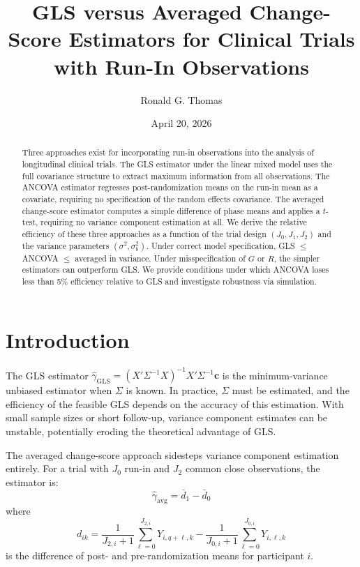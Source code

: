 \documentclass[
  11pt,
]{article}
\title{GLS versus Averaged Change-Score Estimators for Clinical Trials
with Run-In Observations}
\author{Ronald G. Thomas}
\date{April 20, 2026}
\begin{document}
\maketitle
\begin{abstract}
Three approaches exist for incorporating run-in observations into the
analysis of longitudinal clinical trials. The GLS estimator under the
linear mixed model uses the full covariance structure to extract maximum
information from all observations. The ANCOVA estimator regresses
post-randomization means on the run-in mean as a covariate, requiring no
specification of the random effects covariance. The averaged
change-score estimator computes a simple difference of phase means and
applies a \(t\)-test, requiring no variance component estimation at all.
We derive the relative efficiency of these three approaches as a
function of the trial design \((J_0, J_1, J_2)\) and the variance
parameters \((\sigma^2, \sigma_b^2)\). Under correct model
specification, GLS \(\le\) ANCOVA \(\le\) averaged in variance. Under
misspecification of \(G\) or \(R\), the simpler estimators can
outperform GLS. We provide conditions under which ANCOVA loses less than
5\% efficiency relative to GLS and investigate robustness via
simulation.
\end{abstract}

{
\setcounter{tocdepth}{2}
\tableofcontents
}
\section{Introduction}\label{introduction}

The GLS estimator \(\hat\gamma_{\text{GLS}} =
(X'\Sigma^{-1}X)^{-1}X'\Sigma^{-1}\mathbf{c}\) is the minimum-variance
unbiased estimator when \(\Sigma\) is known. In practice, \(\Sigma\)
must be estimated, and the efficiency of the feasible GLS depends on the
accuracy of this estimation. With small sample sizes or short follow-up,
variance component estimates can be unstable, potentially eroding the
theoretical advantage of GLS.

The averaged change-score approach sidesteps variance component
estimation entirely. For a trial with \(J_0\) run-in and \(J_2\) common
close observations, the estimator is: \begin{equation}
  \hat\gamma_{\text{avg}} = \bar{d}_1 - \bar{d}_0
\end{equation} where \begin{equation}
  d_{ik} = \frac{1}{J_{2,i} + 1}
    \sum_{\ell=0}^{J_{2,i}} Y_{i,q+\ell,k}
    - \frac{1}{J_{0,i} + 1}
    \sum_{\ell=0}^{J_{0,i}} Y_{i,\ell,k}
\end{equation} is the difference of post- and pre-randomization means
for participant \(i\).
\end{document}
